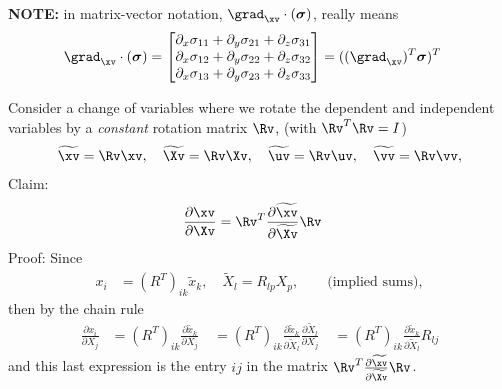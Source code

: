{\bf NOTE:} in matrix-vector notation, $\grad_{\xv}\cdot( \sigmav)$, really means
\begin{align}
\grad_{\xv}\cdot( \sigmav) &= 
         \begin{bmatrix} 
           \partial_x \sigma_{11} + \partial_y \sigma_{21} +\partial_z \sigma_{31} \\
           \partial_x \sigma_{12} + \partial_y \sigma_{22} +\partial_z \sigma_{32} \\
           \partial_x \sigma_{13} + \partial_y \sigma_{23} +\partial_z \sigma_{33} 
         \end{bmatrix} 
          =  ((\grad_{\xv})^T \sigmav )^T  \label{eq:divSigma}
\end{align}


Consider a change of variables where we rotate the dependent and independent variables by
a {\em constant} rotation matrix $\Rv$, (with $\Rv^T \Rv=I$)
\newcommand{\xt}{\tilde{x}}
\newcommand{\Xt}{\tilde{X}}
\newcommand{\xvt}{\widetilde{\xv}}
\newcommand{\Xvt}{\widetilde{\Xv}}
\newcommand{\uvt}{\widetilde{\uv}}
\newcommand{\vvt}{\widetilde{\vv}}
\newcommand{\Fvt}{\widetilde{\Fv}}
\newcommand{\Jt}{\widetilde{J}}
\newcommand{\Evt}{\widetilde{\Ev}}
\newcommand{\Svt}{\widetilde{\Sv}}
\newcommand{\sigmavt}{\widetilde{\sigmav}}
\begin{align}
  \xvt &= \Rv \xv, \quad \Xvt = \Rv \Xv, \quad \uvt = \Rv \uv, \quad \vvt = \Rv \vv, \\
\end{align}
Claim:
\begin{align}
  \frac{\partial \xv}{\partial \Xv} &=  \Rv^T \frac{\partial \xvt}{\partial \Xvt} \Rv
\end{align}
Proof: Since
\begin{align}
    x_i &= (R^T)_{ik} \xt_k , \quad \Xt_l = R_{lp} X_p, \qquad\text{(implied sums)}, 
\end{align}
then by the chain rule
\begin{align}
   \frac{\partial x_i}{\partial X_j} &= (R^T)_{ik} \frac{\partial \xt_k}{\partial X_j} \quad
         = (R^T)_{ik} \frac{\partial \xt_k}{\partial \Xt_l} \frac{\partial \Xt_l}{\partial X_j}  \quad
         = (R^T)_{ik} \frac{\partial \xt_k}{\partial \Xt_l} R_{lj} 
\end{align}
and this last expression is the entry $ij$ in the matrix $\Rv^T \frac{\partial \xvt}{\partial \Xvt} \Rv$.

